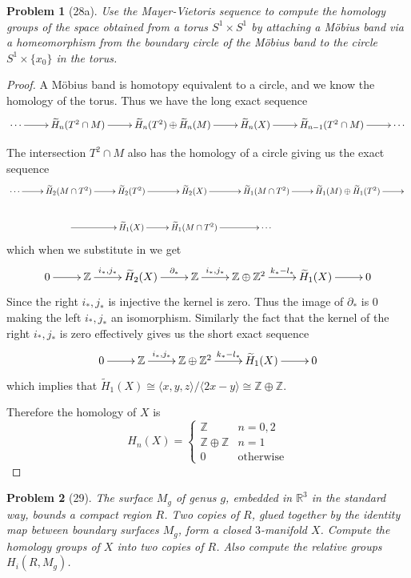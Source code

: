 \documentclass[10pt]{article}
\newcommand{\sk}{\vskip 10mm}
\newcommand{\bb}[1]{\mathbb{#1}}
\newcommand{\rH}{\widetilde{H}}
\theoremstyle{plain}
\newtheorem{problem}{Problem}
\theoremstyle{remark}
\begin{document}
\begin{problem}[28a]
  Use the Mayer-Vietoris sequence to compute the homology groups of the space
  obtained from a torus $S^1\times S^1$ by attaching a M\"obius band via a
  homeomorphism from the boundary circle of the M\"obius band to the
  circle $S^1\times \{ x_0\}$ in the torus. 
\end{problem}

\begin{proof}
  A M\"obius band is homotopy equivalent to a circle, and we know the homology
  of the torus. Thus we have the long exact sequence
  \[
    \xymatrix{
      \cdots \ar[r] & \rH_n(T^2\cap M) \ar[r] & \rH_n(T^2)\oplus \rH_n(M) \ar[r] & \rH_n(X) \ar[r] & \rH_{n-1}(T^2\cap M) \ar[r] & \cdots
    }
  \]

  The intersection $T^2\cap M$ also has the homology of a circle giving us the exact sequence
  \[
    \xymatrix{
      \cdots \ar[r] & \rH_2(M\cap T^2) \ar[r] & \rH_2(T^2) \ar[r] & \rH_2(X) \ar[r] & \rH_1(M\cap T^2) \ar[r] & \rH_1(M)\oplus\rH_1(T^2) \ar[r] & \\
      &\ar[r] & \rH_1(X) \ar[r] & \rH_1(M\cap T^2) \ar[r] & \cdots
    }
  \]
  which when we substitute in we get
  \[
    \xymatrix{
      0 \ar[r] & \bb{Z} \ar[r]^-{i_*,j_*} & \rH_2(X) \ar[r]^-{\partial_*} & \bb{Z} \ar[r]^-{i_*,j_*} & \bb{Z}\oplus\bb{Z}^2 \ar[r]^-{k_*-l_*} & \rH_1(X) \ar[r] & 0
    }
  \]
  Since the right $i_*,j_*$ is injective the kernel is zero. Thus the image of $\partial_*$
  is 0 making the left $i_*,j_*$ an isomorphism. Similarly the fact that the kernel
  of the right $i_*,j_*$ is zero effectively gives us the short exact sequence
  \[
    \xymatrix{
      0 \ar[r] & \bb{Z} \ar[r]^-{i_*,j_*} & \bb{Z}\oplus\bb{Z}^2 \ar[r]^-{k_*-l_*} & \rH_1(X) \ar[r] & 0
    }
  \]
  which implies that $\rH_1(X)\cong \langle x,y,z\rangle/\langle 2x-y\rangle\cong \bb{Z}\oplus\bb{Z}$.

  Therefore the homology of $X$ is
  \[
    H_n(X) =
    \left\{
      \begin{array}{cr}
        \bb{Z} & n=0,2\\
        \bb{Z}\oplus\bb{Z} & n=1\\
        0 & \text{otherwise}
      \end{array}
    \right.
  \]
  
\end{proof}

\sk

\begin{problem}[29]
  The surface $M_g$ of genus $g$, embedded in $\bb{R}^3$ in the standard way,
  bounds a compact region $R$. Two copies of $R$, glued together by the identity
  map between boundary surfaces $M_g$, form a closed $3$-manifold $X$.
  Compute the homology groups of $X$ into two copies of $R$. Also compute the
  relative groups $H_i(R,M_g)$.
\end{problem}
\end{document}
